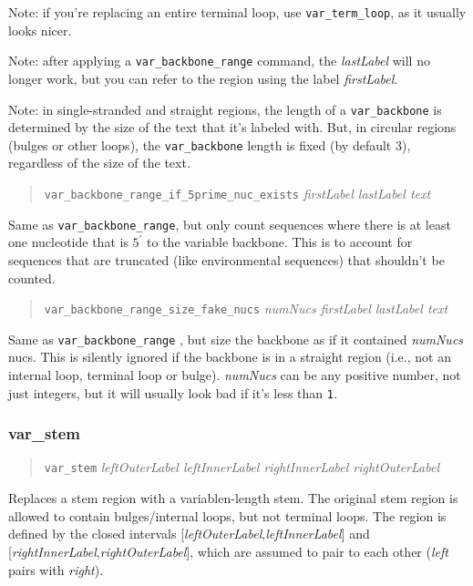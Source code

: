 \documentclass[letterpaper,12pt]{report}
\newcommand{\comment}[1]{}
\newcommand{\example}[1]{
\begin{quote}
{\raggedright
#1
}
\end{quote}
}
\begin{document}
Note: if you{\textquoteright}re replacing an entire terminal loop, use
{\tt var\_term\_loop}, as it usually looks nicer.

Note: after applying a {\tt var\_backbone\_range} command, the {\it lastLabel}
will no longer work, but you can refer to the region using
the label {\it firstLabel}.

Note: in single-stranded and straight regions, the length of a
{\tt var\_backbone} is determined by the size of the text that
it{\textquoteright}s labeled with. But, in circular regions (bulges or other loops), the
{\tt var\_backbone} length is fixed (by default 3), regardless of the size of
the text.

\example{{\tt var\_backbone\_range\_if\_5prime\_nuc\_exists}  \textit{firstLabel 
lastLabel text}}

Same as {\tt var\_backbone\_range}, but only count sequences where there is at
least one nucleotide that is $5^\prime$ to the variable backbone.  This
is to account for sequences that are truncated (like environmental
sequences) that shouldn{\textquoteright}t be counted.

\example{{\tt var\_backbone\_range\_size\_fake\_nucs}  \textit{numNucs  firstLabel 
lastLabel text}}

Same as {\tt var\_backbone\_range} , but size the backbone as if it contained
\textit{numNucs} nucs.  This is silently ignored if the backbone is in
a straight region (i.e., not an internal loop, terminal loop or bulge).  {\it numNucs} can be any positive number, not just integers, but it will usually look bad if it's less than {\tt 1}.

\comment{
DEBUGGING R2R: there{\textquoteright}s an {\tt \#if 0} directive in the C++ code that
handles these; change it to a {\tt 1}.
}

\subsubsection{var\_stem}
\example{{\tt var\_stem}  \textit{leftOuterLabel  leftInnerLabel  rightInnerLabel 
rightOuterLabel}}

Replaces a stem region with a variablen-length stem.  The original stem
region is allowed to contain bulges/internal loops, but not terminal
loops.  The region is defined by the closed intervals
[\textit{leftOuterLabel},\textit{leftInnerLabel}] and
[\textit{rightInnerLabel},\textit{rightOuterLabel}], which are assumed
to pair to each other (\textit{left} pairs with \textit{right}).
\end{document}
